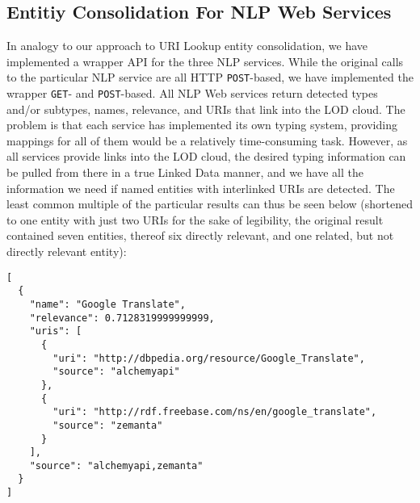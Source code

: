 \documentclass{acm_proc_article-sp}
\begin{document}
\subsection{Entitiy Consolidation For NLP Web Services}\label{sec:consolidation2}
In analogy to our approach to URI Lookup entity consolidation, we have implemented a wrapper API for the three NLP services. While the original calls to the particular NLP service are all HTTP \texttt{POST}-based, we have implemented the wrapper \texttt{GET}- and \texttt{POST}-based. All NLP Web services return detected types and/or subtypes, names, relevance, and URIs that link into the LOD cloud. The problem is that each service has implemented its own typing system, providing mappings for all of them would be a relatively time-consuming task. However, as all services provide links into the LOD cloud, the desired typing information can be pulled from there in a true Linked Data manner, and we have all the information we need if named entities with interlinked URIs are detected. The least common multiple of the particular results can thus be seen below (shortened to one entity with just two URIs for the sake of legibility, the original result contained seven entities, thereof six directly relevant, and one related, but not directly relevant entity):


\begin{lstlisting}
[ 
  {
    "name": "Google Translate",
    "relevance": 0.7128319999999999,
    "uris": [
      {
        "uri": "http://dbpedia.org/resource/Google_Translate",
        "source": "alchemyapi"
      },
      {
        "uri": "http://rdf.freebase.com/ns/en/google_translate",
        "source": "zemanta"
      }
    ],
    "source": "alchemyapi,zemanta"
  }
]
\end{lstlisting}

\end{document}
